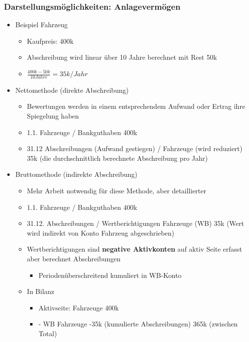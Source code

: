 \subsubsection{Darstellungsmöglichkeiten: Anlagevermögen}
\begin{itemize}
    \item Beispiel Fahrzeug
    \begin{itemize}
        \item Kaufpreis: 400k
        \item Abschreibung wird linear über 10 Jahre berechnet mit Rest 50k
        \item $\frac{400k - 50k}{10 Jahre} = 35k/Jahr$ 
    \end{itemize}
    \item Nettomethode (direkte Abschreibung)
    \begin{itemize}
        \item Bewertungen werden in einem entsprechendem Aufwand oder Ertrag ihre Spiegelung haben
        \item 1.1. Fahrzeuge / Bankguthaben 400k
        \item 31.12 Abschreibungen (Aufwand gestiegen) / Fahrzeuge (wird reduziert)  35k (die durchschnittlich berechnete Abschreibung pro Jahr)
    \end{itemize}
    \item Bruttomethode (indirekte Abschreibung)
    \begin{itemize}
        \item Mehr Arbeit notwendig für diese Methode, aber detaillierter
        \item 1.1. Fahrzeuge / Bankguthaben 400k
        \item 31.12. Abschreibungen / Wertberichtigungen Fahrzeuge (WB) 35k (Wert wird indirekt von Konto Fahrzeug abgeschrieben)
        \item Wertberichtigungen sind \textbf{negative Aktivkonten} auf aktiv Seite erfasst aber berechnet Abschreibungen
        \begin{itemize}
            \item Periodenüberschreitend kumuliert in WB-Konto 
        \end{itemize}
        \item In Bilanz
        \begin{itemize}
            \item Aktivseite: Fahrzeuge 400k
            \item - WB Fahrzeuge -35k (kumulierte Abschreibungen)   365k (zwischen Total)
        \end{itemize}
    \end{itemize}
\end{itemize}

